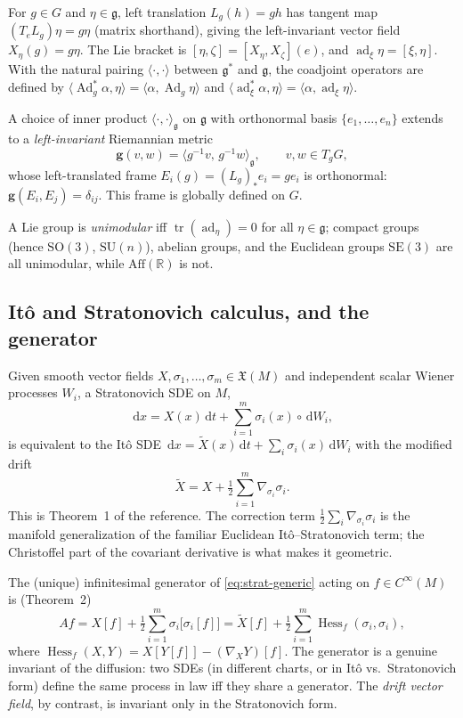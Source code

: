 \documentclass[11pt]{article}
\theoremstyle{plain}
\theoremstyle{definition}
\newcommand{\g}{\mathfrak{g}}
\newcommand{\gstar}{\mathfrak{g}^{*}}
\newcommand{\SO}{\mathrm{SO}(3)}
\newcommand{\SE}{\mathrm{SE}(3)}
\newcommand{\ad}{\operatorname{ad}}
\newcommand{\Ad}{\operatorname{Ad}}
\newcommand{\adstar}{\operatorname{ad}^{*}}
\newcommand{\Adstar}{\operatorname{Ad}^{*}}
\newcommand{\cd}{\,\mathrm{d}}          %
\newcommand{\dW}{\,\mathrm{d}W}
\newcommand{\dt}{\,\mathrm{d}t}
\newcommand{\Strat}{\circ\,\mathrm{d}W}
\newcommand{\Hess}{\operatorname{Hess}}
\newcommand{\R}{\mathbb{R}}
\newcommand{\inner}[2]{\langle #1,#2\rangle}
\DeclareMathOperator{\tr}{tr}
\newcommand{\half}{\tfrac{1}{2}}
\begin{document}
For $g\in G$ and $\eta\in\g$, left translation $L_g(h)=gh$ has tangent map
$(T_eL_g)\eta = g\eta$ (matrix shorthand), giving the left-invariant vector field
$X_\eta(g)=g\eta$. The Lie bracket is
$[\eta,\zeta]=[X_\eta,X_\zeta](e)$, and $\ad_\xi\eta=[\xi,\eta]$. With the natural
pairing $\inner{\cdot}{\cdot}$ between $\gstar$ and $\g$, the coadjoint operators
are defined by $\inner{\Adstar_g\alpha}{\eta}=\inner{\alpha}{\Ad_g\eta}$ and
$\inner{\adstar_\xi\alpha}{\eta}=\inner{\alpha}{\ad_\xi\eta}$.

A choice of inner product $\inner{\cdot}{\cdot}_\g$ on $\g$ with orthonormal
basis $\{e_1,\dots,e_n\}$ extends to a \emph{left-invariant} Riemannian metric
\begin{equation}
  \mathbf{g}(v,w)=\inner{g^{-1}v}{\,g^{-1}w}_\g, \qquad v,w\in T_gG,
  \label{eq:leftinv-metric}
\end{equation}
whose left-translated frame $E_i(g)=(L_g)_*e_i=g e_i$ is orthonormal:
$\mathbf{g}(E_i,E_j)=\delta_{ij}$. This frame is globally defined on $G$.

A Lie group is \emph{unimodular} iff $\tr(\ad_\eta)=0$ for all $\eta\in\g$;
compact groups (hence $\SO$, $\mathrm{SU}(n)$), abelian groups, and the
Euclidean groups $\SE$ are all unimodular, while $\mathrm{Aff}(\R)$ is not.

\subsection{It\^o and Stratonovich calculus, and the generator}

Given smooth vector fields $X,\sigma_1,\dots,\sigma_m\in\mathfrak{X}(M)$ and
independent scalar Wiener processes $W_i$, a Stratonovich SDE on $M$,
\begin{equation}
  \cd x = X(x)\dt + \sum_{i=1}^m \sigma_i(x)\Strat_i,
  \label{eq:strat-generic}
\end{equation}
is equivalent to the It\^o SDE $\cd x=\tilde X(x)\dt+\sum_i\sigma_i(x)\dW_i$ with
the modified drift
\begin{equation}
  \tilde X = X + \half\sum_{i=1}^m \nabla_{\sigma_i}\sigma_i .
  \label{eq:ito-strat}
\end{equation}
This is Theorem~1 of the reference. The correction term
$\half\sum_i\nabla_{\sigma_i}\sigma_i$ is the manifold generalization of the
familiar Euclidean It\^o--Stratonovich term; the Christoffel part of the
covariant derivative is what makes it geometric.

The (unique) infinitesimal generator of \eqref{eq:strat-generic} acting on
$f\in C^\infty(M)$ is (Theorem~2)
\begin{equation}
  Af = X[f] + \half\sum_{i=1}^m \sigma_i\big[\sigma_i[f]\big]
     = \tilde X[f] + \half\sum_{i=1}^m \Hess_f(\sigma_i,\sigma_i),
  \label{eq:generator}
\end{equation}
where $\Hess_f(X,Y)=X[Y[f]]-(\nabla_XY)[f]$. The generator is a genuine
invariant of the diffusion: two SDEs (in different charts, or in It\^o vs.\
Stratonovich form) define the same process in law iff they share a generator.
The \emph{drift vector field}, by contrast, is invariant only in the
Stratonovich form.
\end{document}
